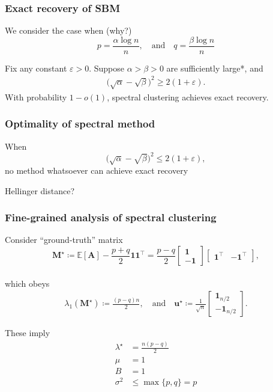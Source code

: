 \documentclass[compress,
mathserif,wide,%
]{beamer}
\begin{document}
\begin{frame}
	\frametitle{Exact recovery of SBM}
	We consider the case when (why?)
	\[
	p=\frac{\alpha \log n}{n}, \quad \text{and} \quad q=\frac{\beta \log n}{n}
	\]
	
	\begin{theorem}
	\label{thm:community-recovery-linf}
	Fix any constant $\varepsilon>0$. Suppose $\alpha > \beta >0$ are sufficiently large*, and	%
	\begin{align}
		\big( \sqrt{\alpha} -\sqrt{\beta}\big)^2 \geq   2\left( 1+ \varepsilon  \right) .
		\label{eq:H-pq-lower-bound-theorem}
	\end{align}
	With probability  $1-o(1)$, spectral clustering achieves exact recovery. 
\end{theorem}


\end{frame}

\begin{frame}
	\frametitle{Optimality of spectral method}
	When 
	\[
	\big( \sqrt{\alpha} -\sqrt{\beta}\big)^2 \leq   2\left( 1+ \varepsilon  \right),
	\]
	no method whatsoever can achieve exact recovery
	
	Hellinger distance?
\end{frame}



\begin{frame}
\frametitle{Fine-grained analysis of spectral clustering}
Consider ``ground-truth'' matrix
\[
\bm{M}^{\star}\coloneqq\mathbb{E}[\bm{A}]-\frac{p+q}{2}\bm{1}\bm{1}^{\top}=\frac{p-q}{2}\left[\begin{array}{c}
\bm{1}\\
-\bm{1}
\end{array}\right]\left[\begin{array}{cc}
\bm{1}^{\top} & -\bm{1}^{\top}\end{array}\right], 
\] \\
which obeys 
\begin{align*}
	\lambda_{1}(\bm{M}^{\star})\coloneqq\frac{(p-q)n}{2},  
	\quad \text{and} \quad
	\bm{u}^{\star}  \coloneqq \frac{1}{\sqrt{n}}
	\left[\begin{array}{c}
		\bm{1}_{n/2}\\
		-\bm{1}_{n/2}
	\end{array}\right].
\end{align*}

	
These imply	\begin{align*}
\lambda^{\star} & =\tfrac{n(p-q)}{2}\\
\mu & =1\\
B & =1\\
\sigma^{2} & \leq\max\{p,q\}=p
\end{align*}

\end{frame}
\end{document}
